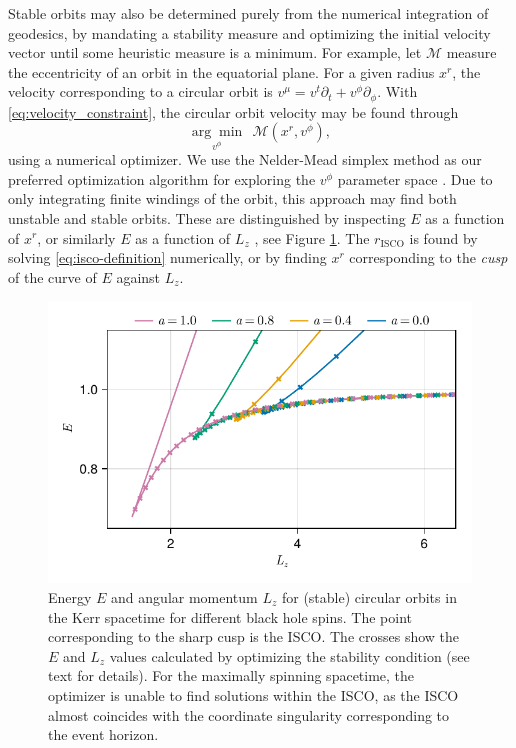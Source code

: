 \documentclass[fleqn,usenatbib]{mnras}
\newcommand{\risco}{r_\text{ISCO}}
\begin{document}
Stable orbits may also be determined purely from the numerical integration of
geodesics, by mandating a stability measure and optimizing the initial velocity
vector until some heuristic measure is a minimum. For example, let $\mathscr{M}$
measure the eccentricity of an orbit in the equatorial plane. For a given radius
$x^r$, the velocity corresponding to a circular orbit is $v^\mu = v^t \partial_t
+ v^\phi \partial_\phi $. With \eqref{eq:velocity_constraint}, the circular
orbit velocity may be found through
\begin{equation}
    \underset{v^\phi}{\arg \min}\ \ \mathscr{M}(x^r, v^\phi),
\end{equation}
using a numerical optimizer. We use the Nelder-Mead simplex method as our
preferred optimization algorithm for exploring the $v^\phi$ parameter space
\citep{nelder_simplex_1965}. Due to only integrating finite windings of the
orbit, this approach may find both unstable and stable orbits. These are
distinguished by inspecting $E$ as a function of $x^r$, or similarly $E$ as a
function of $L_z$ \citep{hackmann_charged_2013}, see Figure \ref{fig:e-lz-cusp}.
The $\risco$ is found by solving \eqref{eq:isco-definition} numerically, or
by finding $x^r$ corresponding to the \emph{cusp} of the curve of  $E$ against
$L_z$.

\begin{figure}
    \centering
    \includegraphics[width=0.95\linewidth]{figures/circular-orbits.E-Lz.pdf}
    \caption{Energy $E$ and angular momentum $L_z$ for (stable) circular orbits in the
        Kerr spacetime for different black hole spins. The point corresponding
        to the sharp cusp is the ISCO. The crosses show the $E$ and $L_z$
        values calculated by optimizing the stability condition (see text for
        details). For the maximally spinning spacetime, the optimizer is unable
    to find solutions within the ISCO, as the ISCO almost coincides with the
coordinate singularity corresponding to the event horizon.}
    \label{fig:e-lz-cusp}
\end{figure}
\end{document}
